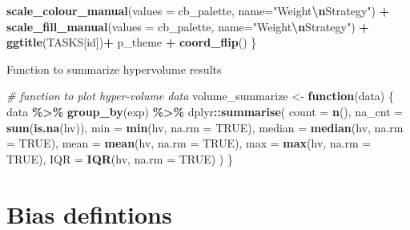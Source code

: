 \documentclass[
]{book}
\newenvironment{Shaded}{\begin{snugshade}}{\end{snugshade}}
\newcommand{\AttributeTok}[1]{\textcolor[rgb]{0.13,0.29,0.53}{#1}}
\newcommand{\CommentTok}[1]{\textcolor[rgb]{0.56,0.35,0.01}{\textit{#1}}}
\newcommand{\ConstantTok}[1]{\textcolor[rgb]{0.56,0.35,0.01}{#1}}
\newcommand{\ControlFlowTok}[1]{\textcolor[rgb]{0.13,0.29,0.53}{\textbf{#1}}}
\newcommand{\FunctionTok}[1]{\textcolor[rgb]{0.13,0.29,0.53}{\textbf{#1}}}
\newcommand{\NormalTok}[1]{#1}
\newcommand{\OtherTok}[1]{\textcolor[rgb]{0.56,0.35,0.01}{#1}}
\newcommand{\SpecialCharTok}[1]{\textcolor[rgb]{0.81,0.36,0.00}{\textbf{#1}}}
\newcommand{\StringTok}[1]{\textcolor[rgb]{0.31,0.60,0.02}{#1}}
\begin{document}
\begin{Shaded}
\begin{Highlighting}[]
    \FunctionTok{scale\_colour\_manual}\NormalTok{(}\AttributeTok{values =}\NormalTok{ cb\_palette, }\AttributeTok{name=}\StringTok{"Weight}\SpecialCharTok{\textbackslash{}n}\StringTok{Strategy"}\NormalTok{) }\SpecialCharTok{+}
    \FunctionTok{scale\_fill\_manual}\NormalTok{(}\AttributeTok{values =}\NormalTok{ cb\_palette, }\AttributeTok{name=}\StringTok{"Weight}\SpecialCharTok{\textbackslash{}n}\StringTok{Strategy"}\NormalTok{) }\SpecialCharTok{+}
    \FunctionTok{ggtitle}\NormalTok{(TASKS[id])}\SpecialCharTok{+}
\NormalTok{    p\_theme }\SpecialCharTok{+} \FunctionTok{coord\_flip}\NormalTok{()}
\NormalTok{  \}}
\end{Highlighting}
\end{Shaded}

Function to summarize hypervolume results

\begin{Shaded}
\begin{Highlighting}[]
\CommentTok{\# function to plot hyper{-}volume data}
\NormalTok{volume\_summarize }\OtherTok{\textless{}{-}} \ControlFlowTok{function}\NormalTok{(data)}
\NormalTok{  \{}
\NormalTok{    data }\SpecialCharTok{\%\textgreater{}\%}
    \FunctionTok{group\_by}\NormalTok{(exp) }\SpecialCharTok{\%\textgreater{}\%}
\NormalTok{    dplyr}\SpecialCharTok{::}\FunctionTok{summarise}\NormalTok{(}
      \AttributeTok{count =} \FunctionTok{n}\NormalTok{(),}
      \AttributeTok{na\_cnt =} \FunctionTok{sum}\NormalTok{(}\FunctionTok{is.na}\NormalTok{(hv)),}
      \AttributeTok{min =} \FunctionTok{min}\NormalTok{(hv, }\AttributeTok{na.rm =} \ConstantTok{TRUE}\NormalTok{),}
      \AttributeTok{median =} \FunctionTok{median}\NormalTok{(hv, }\AttributeTok{na.rm =} \ConstantTok{TRUE}\NormalTok{),}
      \AttributeTok{mean =} \FunctionTok{mean}\NormalTok{(hv, }\AttributeTok{na.rm =} \ConstantTok{TRUE}\NormalTok{),}
      \AttributeTok{max =} \FunctionTok{max}\NormalTok{(hv, }\AttributeTok{na.rm =} \ConstantTok{TRUE}\NormalTok{),}
      \AttributeTok{IQR =} \FunctionTok{IQR}\NormalTok{(hv, }\AttributeTok{na.rm =} \ConstantTok{TRUE}\NormalTok{)}
\NormalTok{    )}
\NormalTok{  \}}
\end{Highlighting}
\end{Shaded}

\hypertarget{bias-defintions}{%
\chapter{Bias defintions}\label{bias-defintions}}
\end{document}
